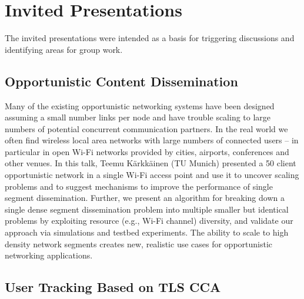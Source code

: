 \section{Invited Presentations}\label{sec:invited-presentations}

The invited presentations were intended as a basis for triggering discussions
and identifying areas for group work.

\subsection{Opportunistic Content Dissemination}

Many of the existing opportunistic networking systems have been designed
assuming a small number links per node and have trouble scaling to large
numbers of potential concurrent communication partners. In the real world we
often find wireless local area networks with large numbers of connected users
– in particular in open Wi-Fi networks provided by cities, airports,
conferences and other venues. In this talk, Teemu Kärkkäinen (TU Munich)
presented a 50 client opportunistic network in a single Wi-Fi access point and
use it to uncover scaling problems and to suggest mechanisms to improve the
performance of single segment dissemination. Further, we present an algorithm
for breaking down a single dense segment dissemination problem into multiple
smaller but identical problems by exploiting resource (e.g., Wi-Fi channel)
diversity, and validate our approach via simulations and testbed experiments.
The ability to scale to high density network segments creates new, realistic
use cases for opportunistic networking applications.

\subsection{User Tracking Based on TLS CCA} %

